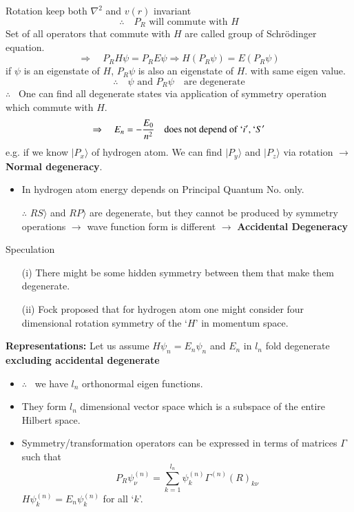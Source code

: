 Rotation keep both $\nabla^{2}$ and $v(r)$ invariant
$$
\therefore\quad P_{R}\text{ will commute with } H
$$
Set of all operators that commute with $H$ are called group of Schr\"odinger equation.
$$
\Rightarrow\quad P_{R}H\psi=P_{R}E\psi\Rightarrow H(P_{R}\psi)=E(P_{R}\psi)
$$
if $\psi$ is an eigenstate of $H$, $P_{R}\psi$ is also an eigenstate of $H$. with same eigen value.
$$
\therefore\quad \psi\text{ and } P_{R}\psi\quad\text{are degenerate}
$$
$\therefore$ \ One can find all degenerate states via application of symmetry operation which commute with $H$.
$$
\Rightarrow\quad E_{n}=-\dfrac{E_{0}}{n^{2}}\quad\text{does not depend of } `i', `S'
$$
e.g. if we know $|P_{x}\rangle$ of hydrogen atom. We can find $|P_{y}\rangle$ and $|P_{z}\rangle$ via rotation $\to$ {\bf Normal degeneracy}.
\begin{itemize}
\item In hydrogen atom energy depends on Principal Quantum No. only.

$\therefore$ $RS\rangle$ and $RP\rangle$ are degenerate, but they cannot be produced by symmetry operations $\to$ wave function form is different $\to$ {\bf Accidental Degeneracy}
\end{itemize}
Speculation
\begin{itemize}
\item[(i)] There might be some hidden symmetry between them that make them degenerate.

\item[(ii)] Fock proposed that for hydrogen atom one might consider four dimensional rotation symmetry of the `$H$' in momentum space.
\end{itemize}

\noindent
{\bf Representations:} Let us assume $H\psi_{n}=E_{n}\psi_{n}$ and $E_{n}$ in $l_{n}$ fold degenerate {\bf excluding accidental degenerate}
\begin{itemize}
\item $\therefore$ \ we have $l_{n}$ orthonormal eigen functions.

\item They form $l_{n}$ dimensional vector space which is a subspace of the entire Hilbert space.

\item Symmetry/transformation operators can be expressed in terms of matrices $\Gamma$ such that
$$
P_{R}\psi^{(n)}_{\nu}=\sum\limits^{l_{n}}_{k=1}\psi^{(n)}_{k}\Gamma^{(n)}(R)_{k\nu}
$$
$H\psi^{(n)}_{k}=E_{n}\psi^{(n)}_{k}$ for all `$k$'.
\end{itemize}


